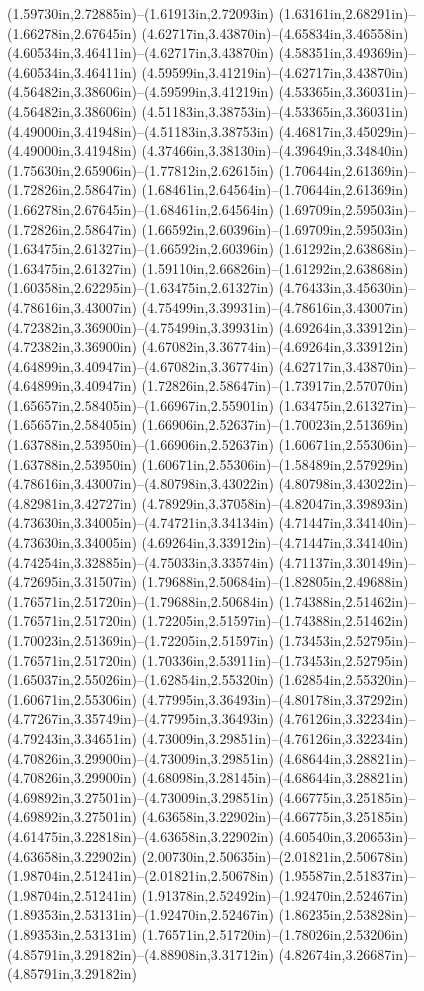 (1.59730in,2.72885in)--(1.61913in,2.72093in) (1.63161in,2.68291in)--(1.66278in,2.67645in) (4.62717in,3.43870in)--(4.65834in,3.46558in) (4.60534in,3.46411in)--(4.62717in,3.43870in) (4.58351in,3.49369in)--(4.60534in,3.46411in) (4.59599in,3.41219in)--(4.62717in,3.43870in) (4.56482in,3.38606in)--(4.59599in,3.41219in) (4.53365in,3.36031in)--(4.56482in,3.38606in) (4.51183in,3.38753in)--(4.53365in,3.36031in) (4.49000in,3.41948in)--(4.51183in,3.38753in) (4.46817in,3.45029in)--(4.49000in,3.41948in) (4.37466in,3.38130in)--(4.39649in,3.34840in) (1.75630in,2.65906in)--(1.77812in,2.62615in) (1.70644in,2.61369in)--(1.72826in,2.58647in) (1.68461in,2.64564in)--(1.70644in,2.61369in) (1.66278in,2.67645in)--(1.68461in,2.64564in) (1.69709in,2.59503in)--(1.72826in,2.58647in) (1.66592in,2.60396in)--(1.69709in,2.59503in) (1.63475in,2.61327in)--(1.66592in,2.60396in) (1.61292in,2.63868in)--(1.63475in,2.61327in) (1.59110in,2.66826in)--(1.61292in,2.63868in) (1.60358in,2.62295in)--(1.63475in,2.61327in) (4.76433in,3.45630in)--(4.78616in,3.43007in) (4.75499in,3.39931in)--(4.78616in,3.43007in) (4.72382in,3.36900in)--(4.75499in,3.39931in) (4.69264in,3.33912in)--(4.72382in,3.36900in) (4.67082in,3.36774in)--(4.69264in,3.33912in) (4.64899in,3.40947in)--(4.67082in,3.36774in) (4.62717in,3.43870in)--(4.64899in,3.40947in) (1.72826in,2.58647in)--(1.73917in,2.57070in) (1.65657in,2.58405in)--(1.66967in,2.55901in) (1.63475in,2.61327in)--(1.65657in,2.58405in) (1.66906in,2.52637in)--(1.70023in,2.51369in) (1.63788in,2.53950in)--(1.66906in,2.52637in) (1.60671in,2.55306in)--(1.63788in,2.53950in) (1.60671in,2.55306in)--(1.58489in,2.57929in) (4.78616in,3.43007in)--(4.80798in,3.43022in) (4.80798in,3.43022in)--(4.82981in,3.42727in) (4.78929in,3.37058in)--(4.82047in,3.39893in) (4.73630in,3.34005in)--(4.74721in,3.34134in) (4.71447in,3.34140in)--(4.73630in,3.34005in) (4.69264in,3.33912in)--(4.71447in,3.34140in) (4.74254in,3.32885in)--(4.75033in,3.33574in) (4.71137in,3.30149in)--(4.72695in,3.31507in) (1.79688in,2.50684in)--(1.82805in,2.49688in) (1.76571in,2.51720in)--(1.79688in,2.50684in) (1.74388in,2.51462in)--(1.76571in,2.51720in) (1.72205in,2.51597in)--(1.74388in,2.51462in) (1.70023in,2.51369in)--(1.72205in,2.51597in) (1.73453in,2.52795in)--(1.76571in,2.51720in) (1.70336in,2.53911in)--(1.73453in,2.52795in) (1.65037in,2.55026in)--(1.62854in,2.55320in) (1.62854in,2.55320in)--(1.60671in,2.55306in) (4.77995in,3.36493in)--(4.80178in,3.37292in) (4.77267in,3.35749in)--(4.77995in,3.36493in) (4.76126in,3.32234in)--(4.79243in,3.34651in) (4.73009in,3.29851in)--(4.76126in,3.32234in) (4.70826in,3.29900in)--(4.73009in,3.29851in) (4.68644in,3.28821in)--(4.70826in,3.29900in) (4.68098in,3.28145in)--(4.68644in,3.28821in) (4.69892in,3.27501in)--(4.73009in,3.29851in) (4.66775in,3.25185in)--(4.69892in,3.27501in) (4.63658in,3.22902in)--(4.66775in,3.25185in) (4.61475in,3.22818in)--(4.63658in,3.22902in) (4.60540in,3.20653in)--(4.63658in,3.22902in) (2.00730in,2.50635in)--(2.01821in,2.50678in) (1.98704in,2.51241in)--(2.01821in,2.50678in) (1.95587in,2.51837in)--(1.98704in,2.51241in) (1.91378in,2.52492in)--(1.92470in,2.52467in) (1.89353in,2.53131in)--(1.92470in,2.52467in) (1.86235in,2.53828in)--(1.89353in,2.53131in) (1.76571in,2.51720in)--(1.78026in,2.53206in) (4.85791in,3.29182in)--(4.88908in,3.31712in) (4.82674in,3.26687in)--(4.85791in,3.29182in) 